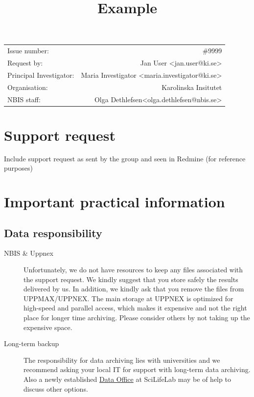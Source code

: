 \documentclass[12pt]{article}
\makeatletter
\newcommand{\staff}{Olga Dethlefsen}
\newcommand{\staffEmail}{olga.dethlefsen@nbis.se}
\newcommand{\noIssue}{\#9999}
\makeatother
\begin{document}
\pagestyle{fancy}


\title{Example}
\author{}
\maketitle
\thispagestyle{fancy}

\vspace{2cm}
\begin{center}
\begin{tabular}{l r}
Issue number: & {\noIssue} \\
Request by: & Jan User <jan.user@ki.se> \\ 
Principal Investigator: & Maria Investigator <maria.investigator@ki.se> \\
Organisation: & Karolinska Insitutet \\
NBIS staff: & {\staff}<{\staffEmail}>
\end{tabular}
\end{center}

\newpage
\tableofcontents

\newpage
\section{Support request}

Include support request as sent by the group and seen in Redmine (for reference purposes)

\section{Important practical information}
\subsection{Data responsibility}
\label{DataRes}
\footnotesize
\begin{description}
\item [NBIS \& Uppnex] Unfortunately, we do not have resources to keep any files associated with the support request. We kindly suggest that you store safely the results delivered by us. In addition, we kindly ask that you remove the files from UPPMAX/UPPNEX. The main storage at UPPNEX is optimized for high-speed and parallel access, which makes it expensive and not the right place for longer time archiving. Please consider others by not taking up the expensive space.
  \item[Long-term backup] The responsibility for data archiving lies with universities and we recommend asking your local IT for support with long-term data archiving. Also a newly established \href{https://www.scilifelab.se/data/}{Data Office} at SciLifeLab may be of help to discuss other options. 
  \end{description}
\end{document}
